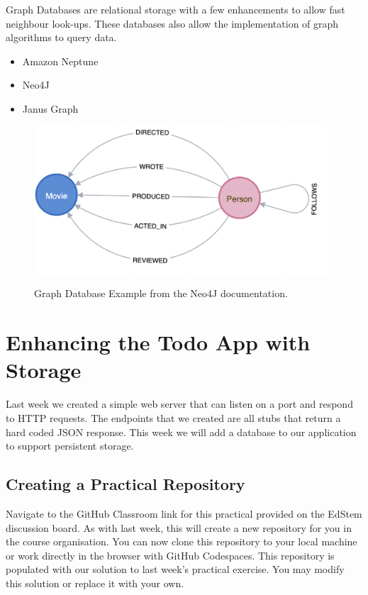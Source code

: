 \documentclass{csse4400}
\begin{document}
Graph Databases are relational storage with a few enhancements to allow fast neighbour look-ups.
These databases also allow the implementation of graph algorithms to query data.

\begin{itemize}
  \item Amazon Neptune
  \item Neo4J
  \item Janus Graph
\end{itemize}

\begin{figure}[h]
  \href{https://neo4j.com/developer/example-project/}{
    \includegraphics[width=\textwidth]{images/graph}
  }
  \caption{Graph Database Example from the Neo4J documentation.}
\end{figure}



\section{Enhancing the Todo App with Storage}

Last week we created a simple web server that can listen on a port and respond to HTTP requests.
The endpoints that we created are all stubs that return a hard coded JSON response.
This week we will add a database to our application to support persistent storage.


\subsection{Creating a Practical Repository}
Navigate to the GitHub Classroom link for this practical provided on the EdStem discussion board.
As with last week, this will create a new repository for you in the course organisation.
You can now clone this repository to your local machine or work directly in the browser with GitHub Codespaces.
This repository is populated with our solution to last week's practical exercise.
You may modify this solution or replace it with your own.
\end{document}
